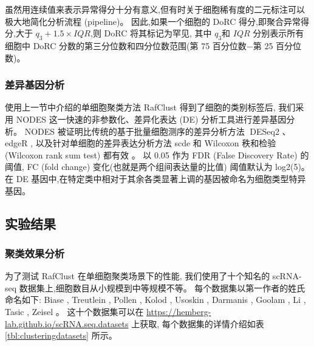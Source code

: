 虽然用连续值来表示异常得分十分有意义,但有时关于细胞稀有度的二元标注可以极大地简化分析流程 (pipeline)。
因此,如果一个细胞的 DoRC 得分,即聚合异常得分,大于 $q_3 + 1.5 \times IQR$,则 DoRC 将其标记为罕见,
其中 $q_3$和 $IQR$ 分别表示所有细胞中 DoRC 分数的第三分位数和四分位数范围(第 75 百分位数$-$第 25 百分位数)。

\subsubsection{差异基因分析}
\label{subsec:de}

使用上一节中介绍的单细胞聚类方法 RafClust 得到了细胞的类别标签后,
我们采用 NODES  这一快速的非参数化、差异化表达 (DE) 分析工具进行差异基因分析。
NODES 被证明比传统的基于批量细胞测序的差异分析方法 DESeq2 、edgeR ,
以及针对单细胞的差异表达分析方法 scde  和 Wilcoxon 秩和检验 (Wilcoxon rank sum test) 都有效 。
以 0.05 作为 FDR (False Discovery Rate) 的阈值, FC (fold change) 变化(也就是两个组间表达量的比值) 阈值默认为 log2(5)。
在 DE 基因中,在特定类中相对于其余各类显著上调的基因被命名为细胞类型特异基因。

\subsection{实验结果}

\subsubsection{聚类效果分析}

为了测试 RafClust 在单细胞聚类场景下的性能,
我们使用了十个知名的 scRNA-seq 数据集上,细胞数目从小规模到中等规模不等。
每个数据集以第一作者的姓氏命名如下: 
Biase ,
Treutlein , 
Pollen , 
Kolod , 
Usoskin , 
Darmanis , 
Goolam , 
Li ,
Tasic , 
Zeisel 。
这十个数据集可以在 \url{https://hemberg-lab.github.io/scRNA.seq.datasets} 上获取, 
每个数据集的详情介绍如表 \ref{tbl:clusteringdatasets} 所示。

